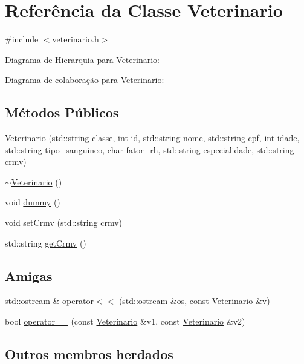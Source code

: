 \hypertarget{classVeterinario}{}\section{Referência da Classe Veterinario}
\label{classVeterinario}


{\ttfamily \#include $<$veterinario.\+h$>$}



Diagrama de Hierarquia para Veterinario\+:


Diagrama de colaboração para Veterinario\+:
\subsection*{Métodos Públicos}
\begin{DoxyCompactItemize}
\item 
\hyperlink{classVeterinario_a1b71c4d5905ec467930ef2b996d8d7ab}{Veterinario} (std\+::string classe, int id, std\+::string nome, std\+::string cpf, int idade, std\+::string tipo\+\_\+sanguineo, char fator\+\_\+rh, std\+::string especialidade, std\+::string crmv)
\item 
\hyperlink{classVeterinario_a0de805e30bc7006d2035458f80c18671}{$\sim$\+Veterinario} ()
\item 
void \hyperlink{classVeterinario_a1a5663f1ff2c9717df7634e0f0d1eb8d}{dummy} ()
\item 
void \hyperlink{classVeterinario_ab2c6b24dd13132a0467983a0d17284fd}{set\+Crmv} (std\+::string crmv)
\item 
std\+::string \hyperlink{classVeterinario_ae2d7672c6d5d336a3fea497845da92c1}{get\+Crmv} ()
\end{DoxyCompactItemize}
\subsection*{Amigas}
\begin{DoxyCompactItemize}
\item 
std\+::ostream \& \hyperlink{classVeterinario_a48166216ec28200840169f222a7b8913}{operator$<$$<$} (std\+::ostream \&os, const \hyperlink{classVeterinario}{Veterinario} \&v)
\item 
bool \hyperlink{classVeterinario_a9de821f84b25bfc5debf622b3613302e}{operator==} (const \hyperlink{classVeterinario}{Veterinario} \&v1, const \hyperlink{classVeterinario}{Veterinario} \&v2)
\end{DoxyCompactItemize}
\subsection*{Outros membros herdados}


